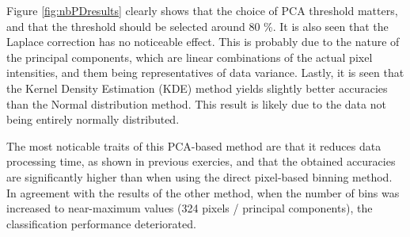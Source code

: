\documentclass[10pt,a4paper]{article}
\begin{document}
Figure \ref{fig:nbPDresults} clearly shows
that the choice of PCA threshold matters, and that the threshold
should be selected around 80 \%.
It is also seen that the Laplace correction has no noticeable effect.
This is probably due to the nature of the principal components,
which are linear combinations of the actual pixel intensities,
and them being representatives of data variance.
Lastly, it is seen that the Kernel Density Estimation (KDE) method
yields slightly better accuracies than the Normal distribution method.
This result is likely due to the data not being entirely normally distributed.

The most noticable traits of this PCA-based method are that
it reduces data processing time, as shown in previous exercies,
and that the obtained accuracies are significantly higher than
when using the direct pixel-based binning method.
In agreement with the results of the other method,
when the number of bins was increased to near-maximum values (324 pixels / principal components),
the classification performance deteriorated.
\end{document}
